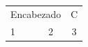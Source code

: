 \documentclass{article}
\begin{document}
\begin{tabular}{lcc}
\multicolumn{2}{c}{Encabezado} & C \\
1 & 2 & 3 \\
\end{tabular}
\end{document}
